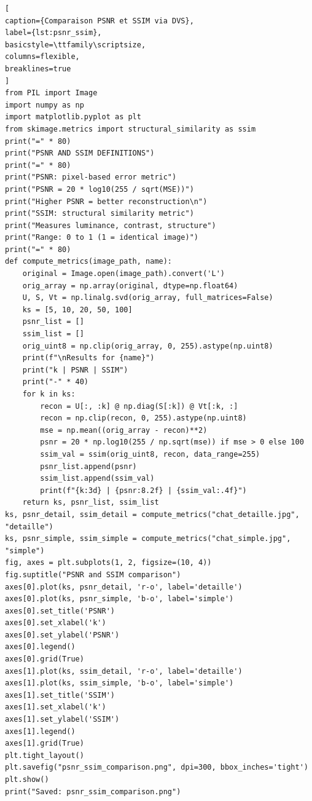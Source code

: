\documentclass[12pt]{report}
\begin{document}
\begin{lstlisting}[
caption={Comparaison PSNR et SSIM via DVS},
label={lst:psnr_ssim},
basicstyle=\ttfamily\scriptsize,
columns=flexible,
breaklines=true
]
from PIL import Image
import numpy as np
import matplotlib.pyplot as plt
from skimage.metrics import structural_similarity as ssim
print("=" * 80)
print("PSNR AND SSIM DEFINITIONS")
print("=" * 80)
print("PSNR: pixel-based error metric")
print("PSNR = 20 * log10(255 / sqrt(MSE))")
print("Higher PSNR = better reconstruction\n")
print("SSIM: structural similarity metric")
print("Measures luminance, contrast, structure")
print("Range: 0 to 1 (1 = identical image)")
print("=" * 80)
def compute_metrics(image_path, name):
    original = Image.open(image_path).convert('L')
    orig_array = np.array(original, dtype=np.float64)
    U, S, Vt = np.linalg.svd(orig_array, full_matrices=False)
    ks = [5, 10, 20, 50, 100]
    psnr_list = []
    ssim_list = []
    orig_uint8 = np.clip(orig_array, 0, 255).astype(np.uint8)
    print(f"\nResults for {name}")
    print("k | PSNR | SSIM")
    print("-" * 40)
    for k in ks:
        recon = U[:, :k] @ np.diag(S[:k]) @ Vt[:k, :]
        recon = np.clip(recon, 0, 255).astype(np.uint8)
        mse = np.mean((orig_array - recon)**2)
        psnr = 20 * np.log10(255 / np.sqrt(mse)) if mse > 0 else 100
        ssim_val = ssim(orig_uint8, recon, data_range=255)
        psnr_list.append(psnr)
        ssim_list.append(ssim_val)
        print(f"{k:3d} | {psnr:8.2f} | {ssim_val:.4f}")
    return ks, psnr_list, ssim_list
ks, psnr_detail, ssim_detail = compute_metrics("chat_detaille.jpg", "detaille")
ks, psnr_simple, ssim_simple = compute_metrics("chat_simple.jpg", "simple")
fig, axes = plt.subplots(1, 2, figsize=(10, 4))
fig.suptitle("PSNR and SSIM comparison")
axes[0].plot(ks, psnr_detail, 'r-o', label='detaille')
axes[0].plot(ks, psnr_simple, 'b-o', label='simple')
axes[0].set_title('PSNR')
axes[0].set_xlabel('k')
axes[0].set_ylabel('PSNR')
axes[0].legend()
axes[0].grid(True)
axes[1].plot(ks, ssim_detail, 'r-o', label='detaille')
axes[1].plot(ks, ssim_simple, 'b-o', label='simple')
axes[1].set_title('SSIM')
axes[1].set_xlabel('k')
axes[1].set_ylabel('SSIM')
axes[1].legend()
axes[1].grid(True)
plt.tight_layout()
plt.savefig("psnr_ssim_comparison.png", dpi=300, bbox_inches='tight')
plt.show()
print("Saved: psnr_ssim_comparison.png")
\end{lstlisting}
\clearpage




\nocite{*}
\end{document}
